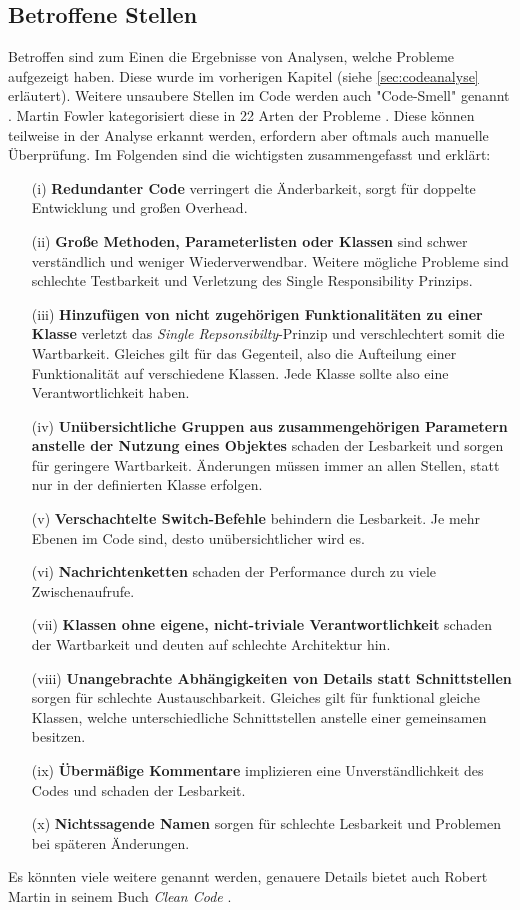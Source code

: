 \subsection{Betroffene Stellen}
\label{subsec:whereRefact}
Betroffen sind zum Einen die Ergebnisse von Analysen, welche Probleme aufgezeigt haben. Diese wurde im vorherigen Kapitel (siehe \autoref{sec:codeanalyse} erläutert). Weitere unsaubere Stellen im Code werden auch "Code-Smell" genannt \cite[S. 67]{fowler2000}. Martin Fowler kategorisiert diese in 22 Arten der Probleme \cite[S. 67 - S. 82]{fowler2000}. Diese können teilweise in der Analyse erkannt werden, erfordern aber oftmals auch manuelle Überprüfung. Im Folgenden sind die wichtigsten zusammengefasst und erklärt:
\begin{itemize}
	\item[(i)] \textbf{Redundanter Code} verringert die Änderbarkeit, sorgt für doppelte Entwicklung und großen Overhead.
	\item[(ii)] \textbf{Große Methoden, Parameterlisten oder Klassen} sind schwer verständlich und weniger Wiederverwendbar. Weitere mögliche Probleme sind schlechte Testbarkeit und Verletzung des Single Responsibility Prinzips.
	\item[(iii)] \textbf{Hinzufügen von nicht zugehörigen Funktionalitäten zu einer Klasse} verletzt das \textit{Single Repsonsibilty}-Prinzip und verschlechtert somit die Wartbarkeit. Gleiches gilt für das Gegenteil, also die Aufteilung einer Funktionalität auf verschiedene Klassen. Jede Klasse sollte also eine Verantwortlichkeit haben.
	\item[(iv)] \textbf{Unübersichtliche Gruppen aus zusammengehörigen Parametern anstelle der Nutzung eines Objektes} schaden der Lesbarkeit und sorgen für geringere Wartbarkeit. Änderungen müssen immer an allen Stellen, statt nur in der definierten Klasse erfolgen.
	\item[(v)] \textbf{Verschachtelte Switch-Befehle} behindern die Lesbarkeit. Je mehr Ebenen im Code sind, desto unübersichtlicher wird es.
	\item[(vi)] \textbf{Nachrichtenketten} schaden der Performance durch zu viele Zwischenaufrufe.
	\item[(vii)] \textbf{Klassen ohne eigene, nicht-triviale Verantwortlichkeit} schaden der Wartbarkeit und deuten auf schlechte Architektur hin.
	\item[(viii)] \textbf{Unangebrachte Abhängigkeiten von Details statt Schnittstellen} sorgen für schlechte Austauschbarkeit. Gleiches gilt für funktional gleiche Klassen, welche unterschiedliche Schnittstellen anstelle einer gemeinsamen besitzen.
	\item[(ix)] \textbf{Übermäßige Kommentare} implizieren eine Unverständlichkeit des Codes und schaden der Lesbarkeit.
	\item[(x)] \textbf{Nichtssagende Namen} sorgen für schlechte Lesbarkeit und Problemen bei späteren Änderungen.
\end{itemize}
Es könnten viele weitere genannt werden, genauere Details bietet auch Robert Martin in seinem Buch \textit{Clean Code} \cite{martin2009}.

